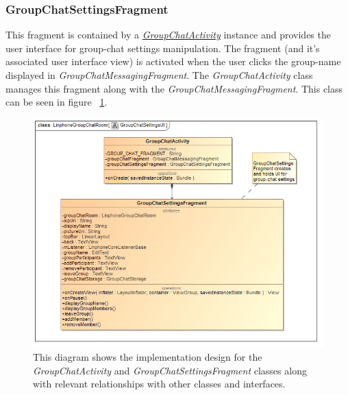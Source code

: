 \documentclass[11pt]{article}
\begin{document}
\subsubsection{GroupChatSettingsFragment}
This fragment is contained by a \textit{ \hyperref[subsubsec: groupchatactivity]{GroupChatActivity}} instance and provides the user interface for group-chat settings manipulation. The fragment (and it's associated user interface view) is activated when the user clicks the group-name displayed in \textit{GroupChatMessagingFragment}. The \textit{GroupChatActivity} class manages this fragment along with the \textit{GroupChatMessagingFragment}. This class can be seen in figure ~\ref{cd-group-chat-settings-ui}.
\begin{figure}[H]
\centering
\includegraphics[width=5in]{./images/class_group_chat_settings_ui.png}
\caption[Android Group Chat Settings UI Class Diagram]{This diagram shows the implementation design for the \textit{GroupChatActivity} and \textit{GroupChatSettingsFragment} classes along with relevant relationships with other classes and interfaces.}
\label{cd-group-chat-settings-ui}
\end{figure}
\end{document}

